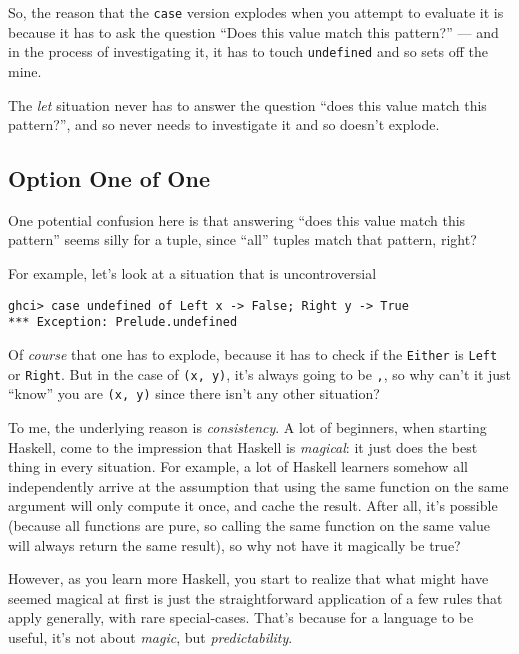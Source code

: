 \documentclass[]{article}
\begin{document}
So, the reason that the \texttt{case} version explodes when you attempt to
evaluate it is because it has to ask the question ``Does this value match this
pattern?'' --- and in the process of investigating it, it has to touch
\texttt{undefined} and so sets off the mine.

The \emph{let} situation never has to answer the question ``does this value
match this pattern?'', and so never needs to investigate it and so doesn't
explode.

\hypertarget{option-one-of-one}{%
\subsection{Option One of One}\label{option-one-of-one}}

One potential confusion here is that answering ``does this value match this
pattern'' seems silly for a tuple, since ``all'' tuples match that pattern,
right?

For example, let's look at a situation that is uncontroversial

\begin{verbatim}
ghci> case undefined of Left x -> False; Right y -> True
*** Exception: Prelude.undefined
\end{verbatim}

Of \emph{course} that one has to explode, because it has to check if the
\texttt{Either} is \texttt{Left} or \texttt{Right}. But in the case of
\texttt{(x,\ y)}, it's always going to be \texttt{,}, so why can't it just
``know'' you are \texttt{(x,\ y)} since there isn't any other situation?

To me, the underlying reason is \emph{consistency}. A lot of beginners, when
starting Haskell, come to the impression that Haskell is \emph{magical}: it just
does the best thing in every situation. For example, a lot of Haskell learners
somehow all independently arrive at the assumption that using the same function
on the same argument will only compute it once, and cache the result. After all,
it's possible (because all functions are pure, so calling the same function on
the same value will always return the same result), so why not have it magically
be true?

However, as you learn more Haskell, you start to realize that what might have
seemed magical at first is just the straightforward application of a few rules
that apply generally, with rare special-cases. That's because for a language to
be useful, it's not about \emph{magic}, but \emph{predictability}.
\end{document}
